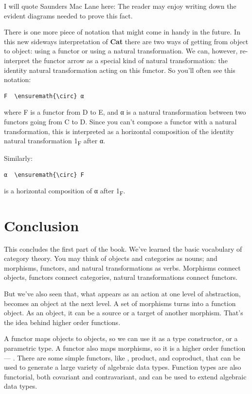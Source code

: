 I will quote Saunders Mac Lane here: The reader may enjoy writing down
the evident diagrams needed to prove this fact.

There is one more piece of notation that might come in handy in the
future. In this new sideways interpretation of \textbf{Cat} there are
two ways of getting from object to object: using a functor or using a
natural transformation. We can, however, re-interpret the functor arrow
as a special kind of natural transformation: the identity natural
transformation acting on this functor. So you'll often see this
notation:

\begin{Verbatim}[commandchars=\\\{\}]
F  \ensuremath{\circ} α
\end{Verbatim}
where F is a functor from D to E, and α is a natural transformation
between two functors going from C to D. Since you can't compose a
functor with a natural transformation, this is interpreted as a
horizontal composition of the identity natural transformation
1\textsubscript{F} after α.

Similarly:

\begin{Verbatim}[commandchars=\\\{\}]
α  \ensuremath{\circ} F
\end{Verbatim}
is a horizontal composition of α after 1\textsubscript{F}.

\section{Conclusion}\label{conclusion}

This concludes the first part of the book. We've learned the basic
vocabulary of category theory. You may think of objects and categories
as nouns; and morphisms, functors, and natural transformations as verbs.
Morphisms connect objects, functors connect categories, natural
transformations connect functors.

But we've also seen that, what appears as an action at one level of
abstraction, becomes an object at the next level. A set of morphisms
turns into a function object. As an object, it can be a source or a
target of another morphism. That's the idea behind higher order
functions.

A functor maps objects to objects, so we can use it as a type
constructor, or a parametric type. A functor also maps morphisms, so it
is a higher order function --- . There are some simple
functors, like , product, and coproduct, that can be used
to generate a large variety of algebraic data types. Function types are
also functorial, both covariant and contravariant, and can be used to
extend algebraic data types.


